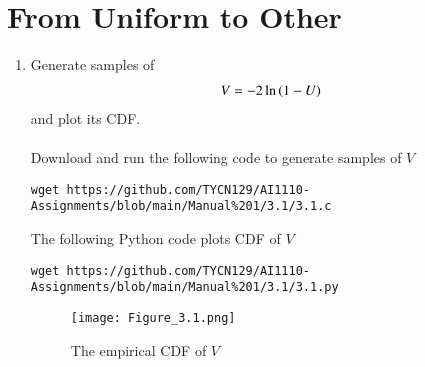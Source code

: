 \documentclass[journal,12pt,twocolumn]{IEEEtran}
\renewcommand\thesection{\arabic{section}}
\begin{document}
\section{From Uniform to Other}
\begin{enumerate}[label=\thesection.\arabic*
,ref=\thesection.\theenumi]
    \item Generate samples of
\begin{align}
V = -2\ln\left(1-U\right)
\end{align}
and plot its CDF. \\
\solution\\
Download and run the following code to generate samples of $V$
\begin{lstlisting}
wget https://github.com/TYCN129/AI1110-Assignments/blob/main/Manual%201/3.1/3.1.c
\end{lstlisting}
The following Python code plots CDF of $V$
\begin{lstlisting}
wget https://github.com/TYCN129/AI1110-Assignments/blob/main/Manual%201/3.1/3.1.py
\end{lstlisting}
\begin{figure}[h!]
    \centering
    \texttt{[image: Figure\_3.1.png]}
    \caption{The empirical CDF of $V$}
    \label{fig:my_label}
\end{figure}


\end{enumerate}
\end{document}
